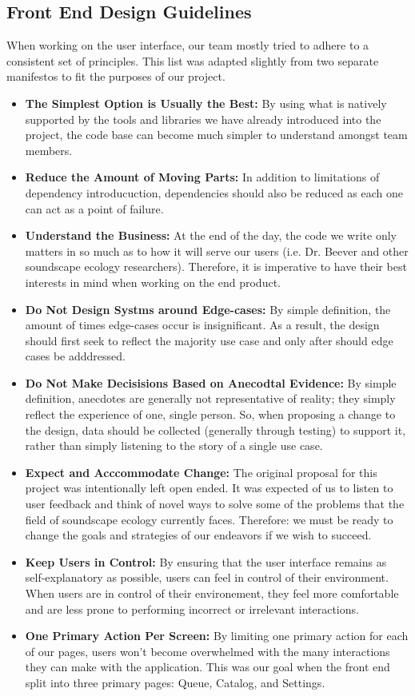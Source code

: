 \subsection{Front End Design Guidelines}
When working on the user interface, our team mostly tried to adhere to a consistent set of principles. This list was adapted slightly from two separate manifestos to fit the purposes of our project.\par

\begin{itemize}
\item \textbf{The Simplest Option is Usually the Best:} By using what is natively supported by the tools and libraries we have already introduced into the project, the code base can become much simpler to understand amongst team members.
\item \textbf{Reduce the Amount of Moving Parts:} In addition to limitations of dependency introducuction, dependencies should also be reduced as each one can act as a point of failure.
\item \textbf{Understand the Business:} At the end of the day, the code we write only matters in so much as to how it will serve our users (i.e. Dr. Beever and other soundscape ecology researchers). Therefore, it is imperative to have their best interests in mind when working on the end product.
\item \textbf{Do Not Design Systms around Edge-cases:} By simple definition, the amount of times edge-cases occur is insignificant. As a result, the design should first seek to reflect the majority use case and only after should edge cases be adddressed.
\item \textbf{Do Not Make Decisisions Based on Anecodtal Evidence:} By simple definition, anecdotes are generally not representative of reality; they simply reflect the experience of one, single person. So, when proposing a change to the design, data should be collected (generally through testing) to support it, rather than simply listening to the story of a single use case.
\item \textbf{Expect and Acccommodate Change:} The original proposal for this project was intentionally left open ended. It was expected of us to listen to user feedback and think of novel ways to solve some of the problems that the field of soundscape ecology currently faces. Therefore: we must be ready to change the goals and strategies of our endeavors if we wish to succeed.
\item \textbf{Keep Users in Control:} By ensuring that the user interface remains as self-explanatory as possible, users can feel in control of their environment. When users are in control of their environement, they feel more comfortable and are less prone to performing incorrect or irrelevant interactions.
\item \textbf{One Primary Action Per Screen:} By limiting one primary action for each of our pages, users won't become overwhelmed with the many interactions they can make with the application. This was our goal when the front end split into three primary pages: Queue, Catalog, and Settings.
\end{itemize}
